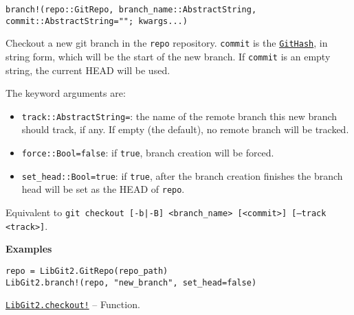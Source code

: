 \begin{adjustwidth}{2em}{0pt}


\begin{verbatim}
branch!(repo::GitRepo, branch_name::AbstractString, commit::AbstractString=""; kwargs...)
\end{verbatim}

Checkout a new git branch in the \texttt{repo} repository. \texttt{commit} is the \hyperlink{202290709580230708}{\texttt{GitHash}}, in string form, which will be the start of the new branch. If \texttt{commit} is an empty string, the current HEAD will be used.

The keyword arguments are:

\begin{itemize}
\item \texttt{track::AbstractString={\textquotedbl}{\textquotedbl}}: the name of the remote branch this new branch should track, if any. If empty (the default), no remote branch will be tracked.


\item \texttt{force::Bool=false}: if \texttt{true}, branch creation will be forced.


\item \texttt{set\_head::Bool=true}: if \texttt{true}, after the branch creation finishes the branch head will be set as the HEAD of \texttt{repo}.

\end{itemize}
Equivalent to \texttt{git checkout [-b|-B] <branch\_name> [<commit>] [--track <track>]}.

\textbf{Examples}


\begin{verbatim}
repo = LibGit2.GitRepo(repo_path)
LibGit2.branch!(repo, "new_branch", set_head=false)
\end{verbatim}



\end{adjustwidth}
\hypertarget{17667204238793225311}{}
\hyperlink{17667204238793225311}{\texttt{LibGit2.checkout!}}  -- {Function.}

